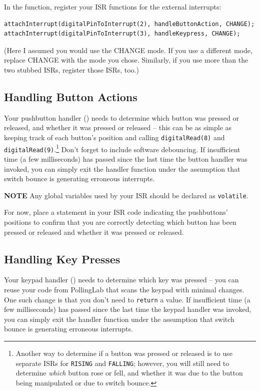 In the  function, register your ISR functions for the external
interrupts:
\begin{lstlisting}
attachInterrupt(digitalPinToInterrupt(2), handleButtonAction, CHANGE);
attachInterrupt(digitalPinToInterrupt(3), handleKeypress, CHANGE);
\end{lstlisting}
(Here I assumed you would use the CHANGE mode. If you use a different mode,
replace CHANGE with the mode you chose. Similarly, if you use more than the two
stubbed ISRs, register those ISRs, too.)

\subsection{Handling Button Actions}

Your pushbutton handler () needs to
determine which button was pressed or released, and whether it was pressed or
released -- this can be as simple as keeping track of each button's position and
calling \lstinline{digitalRead(8)} and
\lstinline{digitalRead(9)}.\footnote{Another way to determine if a button was
pressed or released is to use separate ISRs for \lstinline{RISING} and
\lstinline{FALLING}; however, you will still need to determine \textit{which}
button rose or fell, and whether it was due to the button being manipulated or
due to switch bounce.} Don't forget to include software debouncing. If
insufficient time (a few milliseconds) has passed since the last time the button
handler was invoked, you can simply exit the handler function under the
assumption that switch bounce is generating erroneous interrupts.

\textbf{NOTE} Any global variables used by your ISR should be declared as
\lstinline{volatile}.

For now, place a  statement in your ISR code indicating the
pushbuttons' positions to confirm that you are correctly detecting which button
has been pressed or released and whether it was pressed or released.

\subsection{Handling Key Presses}

Your keypad handler () needs to determine which key was
pressed -- you can reuse your code from PollingLab that scans the keypad with
minimal changes. One such change is that you don't need to \lstinline{return} a
value. If insufficient time (a few milliseconds) has passed since the last time
the keypad handler was invoked, you can simply exit the handler function under
the assumption that switch bounce is generating erroneous interrupts.

